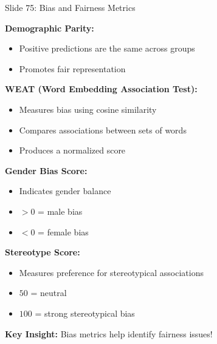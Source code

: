 \documentclass[8pt]{beamer}
\begin{document}
\begin{frame}{Slide 75: Bias and Fairness Metrics}
	\fontsize{6.5}{7.5}\selectfont
	
	\textbf{Demographic Parity:}
	\begin{itemize}
		\item Positive predictions are the same across groups
		\item Promotes fair representation
	\end{itemize}
	
	\vspace{0.1cm}
	\textbf{WEAT (Word Embedding Association Test):}
	\begin{itemize}
		\item Measures bias using cosine similarity
		\item Compares associations between sets of words
		\item Produces a normalized score
	\end{itemize}
	
	\vspace{0.1cm}
	\textbf{Gender Bias Score:}
	\begin{itemize}
		\item Indicates gender balance
		\item $> 0$ = male bias
		\item $< 0$ = female bias
	\end{itemize}
	
	\vspace{0.1cm}
	\textbf{Stereotype Score:}
	\begin{itemize}
		\item Measures preference for stereotypical associations
		\item $50$ = neutral
		\item $100$ = strong stereotypical bias
	\end{itemize}
	
	\textcolor{myblue}{\textbf{Key Insight:}}
	Bias metrics help identify fairness issues!
\end{frame}
\end{document}
